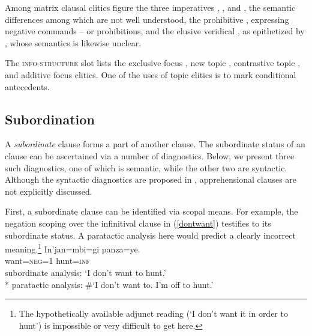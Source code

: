 \documentclass[output=paper,colorlinks,citecolor=brown]{langscibook}
\begin{document}
Among matrix clausal clitics figure the three imperatives , , and , the semantic differences among which are not well understood, the prohibitive , expressing negative commands -- or prohibitions, and the elusive veridical , as epithetized by \citet[35]{fischerhengeveld}, whose semantics is likewise unclear.

{The \textsc{info-structure} slot lists the exclusive focus , new topic , contrastive topic , and additive focus  clitics. One of the uses of topic clitics is to mark conditional antecedents.}




\subsection{{Subordination}} \label{sec:subordination}

A \textit{subordinate} clause
forms a part of another clause. The subordinate status of an  clause can be ascertained via a number of diagnostics. Below, we present three such diagnostics, one of which is semantic, while the other two are syntactic. Although the syntactic diagnostics are proposed in \citet{fischer2011cofan}, apprehensional clauses are not explicitly discussed.

First, a subordinate clause can be identified via scopal means. For example, the negation scoping over the infinitival clause in (\ref{dontwant}) testifies to its subordinate status. A paratactic analysis here would predict a clearly incorrect meaning.\footnote{The hypothetically available adjunct reading (`I don't want it in order to hunt') is impossible or very difficult to get here.} 
    \ea \label{dontwant} %
    \gll In'jan=mbi=gi  {\ob}panza=ye.{\cb}\\
         want=\textsc{neg=1} hunt=\textsc{inf} \\
    \glt subordinate analysis: `I don't want to hunt.' \\*
         paratactic analysis: \#`I don't want to. I'm off to hunt.' 
    \z
\end{document}
